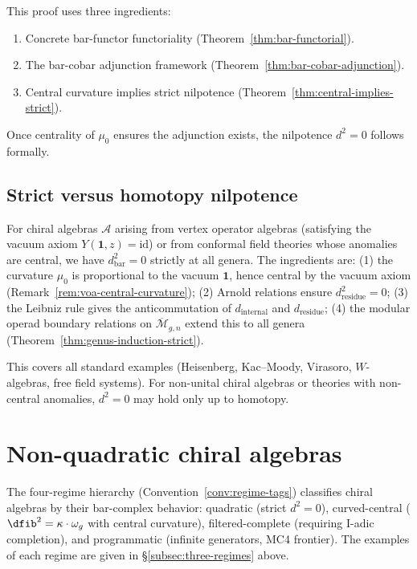 \begin{remark}[Dependencies]
This proof uses three ingredients:
\begin{enumerate}[label=(D\arabic*)]
\item Concrete bar-functor functoriality (Theorem~\ref{thm:bar-functorial}).
\item The bar-cobar adjunction framework (Theorem~\ref{thm:bar-cobar-adjunction}).
\item Central curvature implies strict nilpotence (Theorem~\ref{thm:central-implies-strict}).
\end{enumerate}
\end{remark}

Once centrality of $\mu_0$ ensures the adjunction exists, the nilpotence $d^2 = 0$ follows formally.

\subsection{Strict versus homotopy nilpotence}

\begin{remark}
For chiral algebras $\mathcal{A}$ arising from vertex operator algebras
(satisfying the vacuum axiom $Y(\mathbf{1},z) = \mathrm{id}$) or from
conformal field theories whose anomalies are central, we have $d_{\text{bar}}^2 = 0$ strictly at all genera. The ingredients are: (1) the curvature $\mu_0$ is proportional to the vacuum $\mathbf{1}$, hence central by the vacuum axiom (Remark~\ref{rem:voa-central-curvature}); (2) Arnold relations ensure $d_{\mathrm{residue}}^2 = 0$; (3) the Leibniz rule gives the anticommutation of $d_{\mathrm{internal}}$ and $d_{\mathrm{residue}}$; (4) the modular operad boundary relations on $\overline{\mathcal{M}}_{g,n}$ extend this to all genera (Theorem~\ref{thm:genus-induction-strict}).

This covers all standard examples (Heisenberg, Kac--Moody, Virasoro, $W$-algebras, free field systems). For non-unital chiral algebras or theories with non-central anomalies, $d^2 = 0$ may hold only up to homotopy.
\end{remark}


\section{Non-quadratic chiral algebras}
\label{sec:filtered-vs-curved-comprehensive}

\label{thm:bar-convergence}%
The four-regime hierarchy (Convention~\ref{conv:regime-tags})
classifies chiral algebras by their bar-complex behavior:
quadratic (strict $d^2=0$), curved-central ($\dfib^2 = \kappa\cdot\omega_g$
with central curvature), filtered-complete (requiring I-adic completion),
and programmatic (infinite generators, MC4 frontier).
The examples of each regime are given in
\S\ref{subsec:three-regimes} above.

